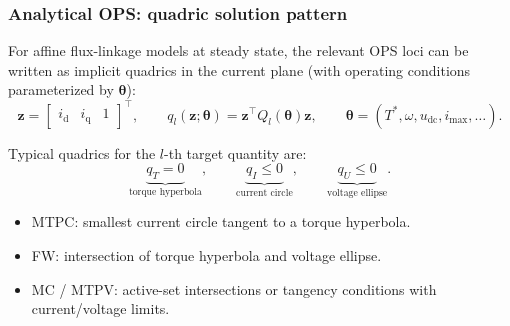 \begin{frame}
    \frametitle{Analytical OPS: quadric solution pattern}
    \setlength{\abovedisplayskip}{2pt}
    \setlength{\belowdisplayskip}{2pt}
    For affine flux-linkage models at steady state, the relevant OPS loci can be written as
    implicit quadrics in the current plane (with operating conditions parameterized by $\bm{\theta}$):
    \[
        \bm{z}=\begin{bmatrix}i_{\mathrm d}&i_{\mathrm q}&1\end{bmatrix}^{\!\top},
        \qquad
        q_l(\bm{z};\bm{\theta})=\bm{z}^\top Q_l(\bm{\theta})\bm{z},
        \qquad
        \bm{\theta}=(T^*,\omega,u_{\mathrm{dc}},i_{\max},\ldots).
    \]
    \vspace{-2mm}
    \begin{center}
    \end{center}
    \vspace{-2mm}\pause%
    Typical quadrics for the $l$-th target quantity are:
    \[
        \underbrace{q_T=0}_{\text{torque hyperbola}},\qquad
        \underbrace{q_I\le 0}_{\text{current circle}},\qquad
        \underbrace{q_U\le 0}_{\text{voltage ellipse}}.
    \]
    \vspace{-2mm}\pause%
    \begin{itemize}
        \item MTPC: smallest current circle tangent to a torque hyperbola.
        \item FW: intersection of torque hyperbola and voltage ellipse.
        \item MC / MTPV: active-set intersections or tangency conditions with current/voltage limits.
    \end{itemize}
\end{frame}


